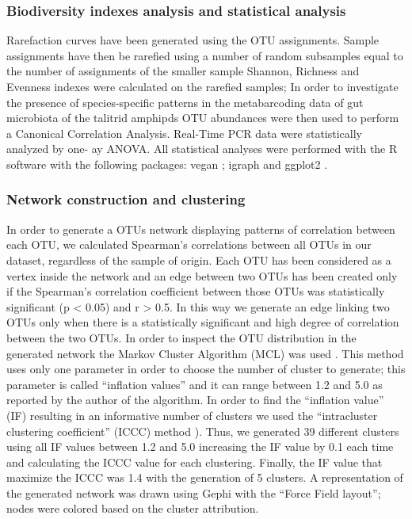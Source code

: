 \subsubsection{Biodiversity indexes analysis and statistical analysis}
Rarefaction curves have been generated using the OTU assignments. Sample assignments have then be rarefied using a number of random subsamples equal to the number of assignments of the smaller sample Shannon, Richness and Evenness indexes were calculated on the rarefied samples; In order to investigate the presence of species-specific patterns in the metabarcoding data of gut microbiota of the talitrid amphipds OTU abundances were then used to perform a Canonical Correlation Analysis. Real-Time PCR data were statistically analyzed by one- ay ANOVA. All statistical analyses were performed with the R software with the following packages: vegan \cite{dixon2003vegan, oksanen2007vegan}; igraph \cite{csardi2006igraph} and ggplot2 \cite{ginestet2011ggplot2}.\\

\subsubsection{Network construction and clustering}
In order to generate a OTUs network displaying patterns of correlation between each OTU, we calculated Spearman's correlations between all OTUs in our dataset, regardless of the sample of origin. Each OTU has been considered as a vertex inside the network and an edge between two OTUs has been created only if the Spearman's correlation coefficient between those OTUs was statistically significant (p {\textless} 0.05) and r {\textgreater} 0.5. In this way we generate an edge linking two OTUs only when there is a statistically significant and high degree of correlation between the two OTUs. In order to inspect the OTU distribution in the generated network the Markov Cluster Algorithm (MCL) was used \cite{van2000graph}. This method uses only one parameter in order to choose the number of cluster to generate; this parameter is called ``inflation values'' and it can range between 1.2 and 5.0 as reported by the author of the algorithm. In order to find the ``inflation value'' (IF) resulting in an informative number of clusters we used the ``intracluster clustering coefficient'' (ICCC) method \cite{lima2008reticulate}). Thus, we generated 39 different clusters using all IF values between 1.2 and 5.0 increasing the IF value by 0.1 each time and calculating the ICCC value for each clustering. Finally, the IF value that maximize the ICCC was 1.4 with the generation of 5 clusters. A representation of the generated network was drawn using Gephi \cite{bastian2009gephi} with the ``Force Field layout''; nodes were colored based on the cluster attribution.\\

